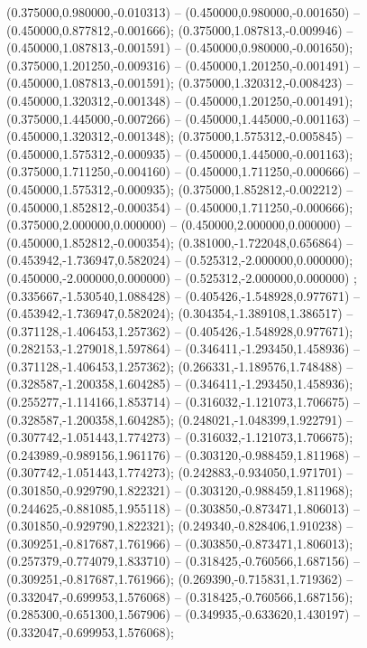  (0.375000,0.980000,-0.010313) -- (0.450000,0.980000,-0.001650) -- (0.450000,0.877812,-0.001666);
 (0.375000,1.087813,-0.009946) -- (0.450000,1.087813,-0.001591) -- (0.450000,0.980000,-0.001650);
 (0.375000,1.201250,-0.009316) -- (0.450000,1.201250,-0.001491) -- (0.450000,1.087813,-0.001591);
 (0.375000,1.320312,-0.008423) -- (0.450000,1.320312,-0.001348) -- (0.450000,1.201250,-0.001491);
 (0.375000,1.445000,-0.007266) -- (0.450000,1.445000,-0.001163) -- (0.450000,1.320312,-0.001348);
 (0.375000,1.575312,-0.005845) -- (0.450000,1.575312,-0.000935) -- (0.450000,1.445000,-0.001163);
 (0.375000,1.711250,-0.004160) -- (0.450000,1.711250,-0.000666) -- (0.450000,1.575312,-0.000935);
 (0.375000,1.852812,-0.002212) -- (0.450000,1.852812,-0.000354) -- (0.450000,1.711250,-0.000666);
 (0.375000,2.000000,0.000000) -- (0.450000,2.000000,0.000000) -- (0.450000,1.852812,-0.000354);
 (0.381000,-1.722048,0.656864) -- (0.453942,-1.736947,0.582024) -- (0.525312,-2.000000,0.000000);
 (0.450000,-2.000000,0.000000) -- (0.525312,-2.000000,0.000000) ;
 (0.335667,-1.530540,1.088428) -- (0.405426,-1.548928,0.977671) -- (0.453942,-1.736947,0.582024);
 (0.304354,-1.389108,1.386517) -- (0.371128,-1.406453,1.257362) -- (0.405426,-1.548928,0.977671);
 (0.282153,-1.279018,1.597864) -- (0.346411,-1.293450,1.458936) -- (0.371128,-1.406453,1.257362);
 (0.266331,-1.189576,1.748488) -- (0.328587,-1.200358,1.604285) -- (0.346411,-1.293450,1.458936);
 (0.255277,-1.114166,1.853714) -- (0.316032,-1.121073,1.706675) -- (0.328587,-1.200358,1.604285);
 (0.248021,-1.048399,1.922791) -- (0.307742,-1.051443,1.774273) -- (0.316032,-1.121073,1.706675);
 (0.243989,-0.989156,1.961176) -- (0.303120,-0.988459,1.811968) -- (0.307742,-1.051443,1.774273);
 (0.242883,-0.934050,1.971701) -- (0.301850,-0.929790,1.822321) -- (0.303120,-0.988459,1.811968);
 (0.244625,-0.881085,1.955118) -- (0.303850,-0.873471,1.806013) -- (0.301850,-0.929790,1.822321);
 (0.249340,-0.828406,1.910238) -- (0.309251,-0.817687,1.761966) -- (0.303850,-0.873471,1.806013);
 (0.257379,-0.774079,1.833710) -- (0.318425,-0.760566,1.687156) -- (0.309251,-0.817687,1.761966);
 (0.269390,-0.715831,1.719362) -- (0.332047,-0.699953,1.576068) -- (0.318425,-0.760566,1.687156);
 (0.285300,-0.651300,1.567906) -- (0.349935,-0.633620,1.430197) -- (0.332047,-0.699953,1.576068);
